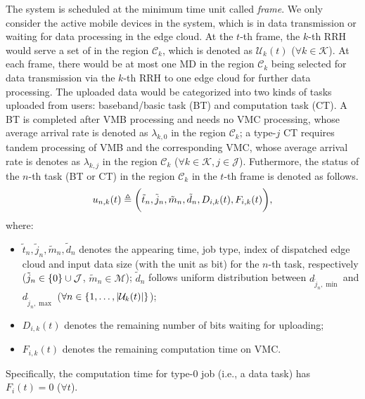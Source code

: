 The system is scheduled at the minimum time unit called \emph{frame}.
We only consider the active mobile devices in the system, which is in data transmission or waiting for data processing in the edge cloud.
At the $t$-th frame, the $k$-th RRH would serve a set of  in the region $\mathcal{C}_{k}$, which is denoted as $\mathcal{U}_{k}(t)$ ($\forall k\in\mathcal{K}$).
At each frame, there would be at most one MD in the region $\mathcal{C}_{k}$ being selected for data transmission via the $k$-th RRH to one edge cloud for further data processing.
The uploaded data would be categorized into two kinds of tasks uploaded from users: baseband/basic task (BT) and computation task (CT).
A BT is completed after VMB processing and needs no VMC processing, whose average arrival rate is denoted as $\lambda_{k,0}$ in the region $\mathcal{C}_{k}$;
a type-$j$ CT requires tandem processing of VMB and the corresponding VMC, whose average arrival rate is denotes as $\lambda_{k,j}$ in the region $\mathcal{C}_{k}$ ($\forall k\in\mathcal{K}, j\in\mathcal{J}$).
Futhermore, the status of the $n$-th task (BT or CT) in the region $\mathcal{C}_{k}$ in the $t$-th frame is denoted as follows.
\begin{align}
    u_{n,k}(t) \triangleq \bigg(
        \tilde{t}_{n}, \tilde{j}_{n}, \tilde{m}_{n}, \tilde{d}_{n}, D_{i,k}(t), F_{i,k}(t)
    \bigg),
\end{align}%
where:
\begin{itemize}
    \item $\tilde{t}_{n}, \tilde{j}_{n}, \tilde{m}_{n}, \tilde{d}_{n}$ denotes the appearing time, job type, index of dispatched edge cloud and input data size (with the unit as bit) for the $n$-th task, respectively ($\tilde{j}_{n}\in\{0\}\cup\mathcal{J}$, $\tilde{m}_{n}\in\mathcal{M}$); $\tilde{d}_{n}$ follows uniform distribution between $d_{\tilde{j}_n,\min}$ and $d_{\tilde{j}_n,\max}$ ($\forall n \in \{1, \dots, |\mathcal{U}_{k}(t)|\}$);
    \item $D_{i,k}(t)$ denotes the remaining number of bits waiting for uploading;
    \item $F_{i,k}(t)$ denotes the remaining computation time on VMC.
\end{itemize}
Specifically, the computation time for type-$0$ job (i.e., a data task) has $F_{i}(t)=0$ ($\forall t$).
